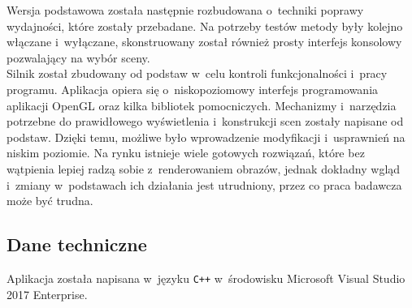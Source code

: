 \documentclass[a4paper,twoside,12pt]{book}
\begin{document}
Wersja podstawowa została następnie rozbudowana o~techniki poprawy wydajności, które zostały przebadane. Na potrzeby testów metody były kolejno włączane i~wyłączane, skonstruowany został również prosty interfejs konsolowy pozwalający na wybór sceny. \\

Silnik został zbudowany od podstaw w~celu kontroli funkcjonalności i~pracy programu. Aplikacja opiera się o~niskopoziomowy interfejs programowania aplikacji OpenGL oraz kilka bibliotek pomocniczych. Mechanizmy i~narzędzia potrzebne do prawidłowego wyświetlenia i~konstrukcji scen zostały napisane od podstaw. Dzięki temu, możliwe było wprowadzenie modyfikacji i~usprawnień na niskim poziomie. Na rynku istnieje wiele gotowych rozwiązań, które bez wątpienia lepiej radzą sobie z~renderowaniem obrazów, jednak dokładny wgląd i~zmiany w~podstawach ich działania jest utrudniony, przez co praca badawcza może być trudna.

\subsection{Dane techniczne}
Aplikacja została napisana w~języku \texttt{C++} w~środowisku Microsoft Visual Studio 2017 Enterprise. 
\end{document}
